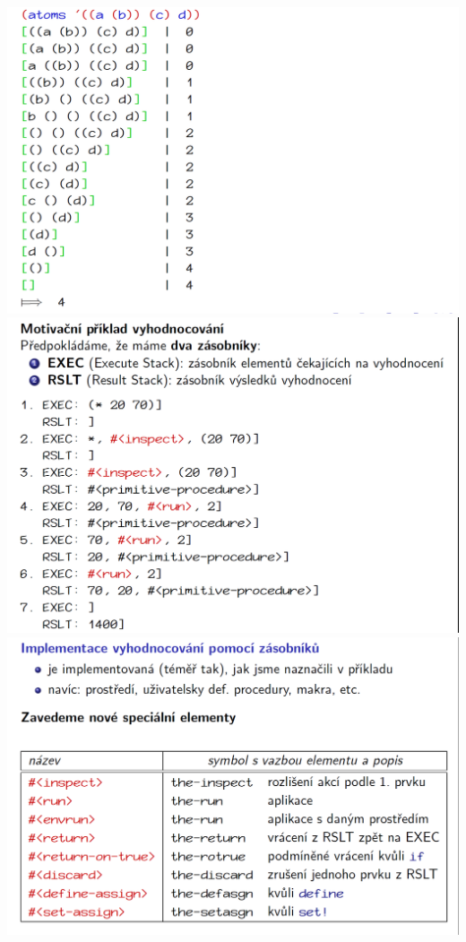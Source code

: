 \documentclass[10pt,a4paper]{article}
\begin{document}
\begin{center}
	\includegraphics[scale=0.3]{img/zasobnikovy_model_4}
	\includegraphics[scale=0.3]{img/zasobnikovy_model_5}
	\includegraphics[scale=0.3]{img/zasobnikovy_model_6}

\end{center}
\end{document}
